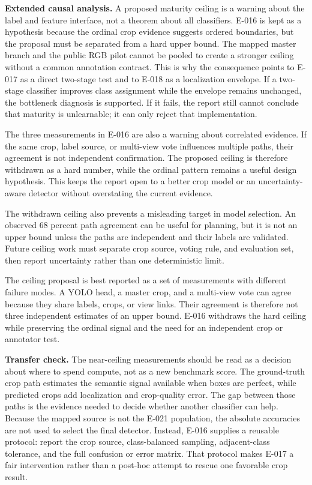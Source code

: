 \documentclass[preprint,12pt]{elsarticle}
\begin{document}
\textbf{Extended causal analysis.} A proposed maturity ceiling is a warning
about the label and feature interface, not a theorem about all classifiers.
E-016 is kept as a hypothesis because the ordinal crop evidence suggests
ordered boundaries, but the proposal must be separated from a hard upper
bound. The mapped master branch and the public RGB pilot cannot be
pooled to create a stronger ceiling without a common annotation contract.
This is why the consequence points to E-017 as a direct two-stage test and to
E-018 as a localization envelope. If a two-stage classifier improves class
assignment while the envelope remains unchanged, the bottleneck diagnosis is
supported. If it fails, the report still cannot conclude that maturity is
unlearnable; it can only reject that implementation.

The three measurements in E-016 are also a warning about correlated evidence.
If the same crop, label source, or multi-view vote influences multiple paths,
their agreement is not independent confirmation. The proposed ceiling is
therefore withdrawn as a hard number, while the ordinal pattern remains a
useful design hypothesis. This keeps the report open to a better crop model or
an uncertainty-aware detector without overstating the current evidence.

The withdrawn ceiling also prevents a misleading target in model selection.
An observed 68 percent path agreement can be useful for planning, but it is
not an upper bound unless the paths are independent and their labels are
validated. Future ceiling work must separate crop source, voting rule, and
evaluation set, then report uncertainty rather than one deterministic limit.

The ceiling proposal is best reported as a set of measurements with different
failure modes. A YOLO head, a master crop, and a multi-view vote can agree
because they share labels, crops, or view links. Their agreement is therefore
not three independent estimates of an upper bound. E-016 withdraws the hard
ceiling while preserving the ordinal signal and the need for an independent
crop or annotator test.

\textbf{Transfer check.} The near-ceiling measurements should be read as a
decision about where to spend compute, not as a new benchmark score. The
ground-truth crop path estimates the semantic signal available when boxes are
perfect, while predicted crops add localization and crop-quality error. The
gap between those paths is the evidence needed to decide whether another
classifier can help. Because the mapped source is not the E-021 population,
the absolute accuracies are not used to select the final detector. Instead,
E-016 supplies a reusable protocol: report the crop source, class-balanced
sampling, adjacent-class tolerance, and the full confusion or error matrix.
That protocol makes E-017 a fair intervention rather than a post-hoc attempt
to rescue one favorable crop result.
\end{document}
